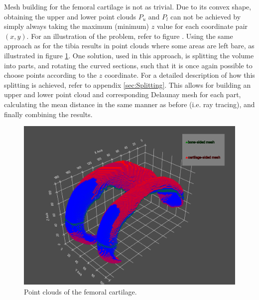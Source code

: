 Mesh building for the femoral cartilage is not as trivial. Due to its convex shape, obtaining the upper and lower point clouds $P_{u}$ and $P_{l}$ can not be achieved by simply always taking the maximum (minimum) $z$ value for each coordinate pair $(x,y)$. For an illustration of the problem, refer to figure . Using the same approach as for the tibia results in point clouds where some areas are left bare, as illustrated in figure \ref{fig:femoral_point_cloud}. One solution, used in this approach, is splitting the volume into parts, and rotating the curved sections, such that it is once again possible to choose points according to the $z$ coordinate. For a detailed description of how this splitting is achieved, refer to appendix \ref{sec:Splitting}. This allows for building an upper and lower point cloud and corresponding Delaunay mesh for each part, calculating the mean distance in the same manner as before (i.e. ray tracing), and finally combining the results.
\begin{figure}[htb!]
	\centering
	\includegraphics[width=\linewidth]{./figures/femoral_points}
	\caption{Point clouds of the femoral cartilage.}
	\label{fig:femoral_point_cloud}
\end{figure}

